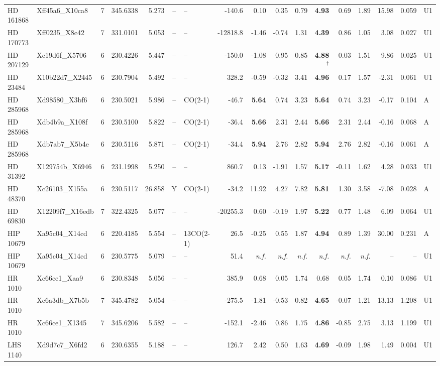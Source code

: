 \begin{tabular}{@{}l@{~}l@{~}c@{~}r@{~}r@{~}c@{~}l@{~}r@{~~}r@{~}r@{~}r@{~~}r@{~}r@{~}r@{~~}r@{~}r@{~}l@{}}
HD 161868 & Xff45a6\_X10ca8 & 7 & 345.6338 & 5.273 & -- & -- & -140.6 & 0.10 & 0.35 & 0.79 & \textbf{4.93} & 0.69 & 1.89 & 15.98 & 0.059 & U1 \\
HD 170773 & Xff0235\_X8c42 & 7 & 331.0101 & 5.053 & -- & -- & -12818.8 & -1.46 & -0.74 & 1.31 & \textbf{4.39} & 0.86 & 1.05 & 3.08 & 0.027 & U1 \\
HD 207129 & Xc19d6f\_X5706 & 6 & 230.4226 & 5.447 & -- & -- & -150.0 & -1.08 & 0.95 & 0.85 & \textbf{4.88}$^{\dagger}$ & 0.03 & 1.51 & 9.86 & 0.025 & U1 \\
HD 23484 & X10b22d7\_X2445 & 6 & 230.7904 & 5.492 & -- & -- & 328.2 & -0.59 & -0.32 & 3.41 & \textbf{4.96} & 0.17 & 1.57 & -2.31 & 0.061 & U1 \\
HD 285968 & Xd98580\_X3bf6 & 6 & 230.5021 & 5.986 & -- & CO(2-1) & -46.7 & \textbf{5.64} & 0.74 & 3.23 & \textbf{5.64} & 0.74 & 3.23 & -0.17 & 0.104 & A \\
HD 285968 & Xdb4b9a\_X108f & 6 & 230.5100 & 5.822 & -- & CO(2-1) & -36.4 & \textbf{5.66} & 2.31 & 2.44 & \textbf{5.66} & 2.31 & 2.44 & -0.16 & 0.068 & A \\
HD 285968 & Xdb7ab7\_X5b4e & 6 & 230.5116 & 5.871 & -- & CO(2-1) & -34.4 & \textbf{5.94} & 2.76 & 2.82 & \textbf{5.94} & 2.76 & 2.82 & -0.16 & 0.061 & A \\
HD 31392 & X129754b\_X6946 & 6 & 231.1998 & 5.250 & -- & -- & 860.7 & 0.13 & -1.91 & 1.57 & \textbf{5.17} & -0.11 & 1.62 & 4.28 & 0.033 & U1 \\
HD 48370 & Xc26103\_X155a & 6 & 230.5117 & 26.858 & Y & CO(2-1) & -34.2 & 11.92 & 4.27 & 7.82 & \textbf{5.81} & 1.30 & 3.58 & -7.08 & 0.028 & A \\
HD 69830 & X12209f7\_X16edb & 7 & 322.4325 & 5.077 & -- & -- & -20255.3 & 0.60 & -0.19 & 1.97 & \textbf{5.22} & 0.77 & 1.48 & 6.09 & 0.064 & U1 \\
HIP 10679 & Xa95c04\_X14cd & 6 & 220.4185 & 5.554 & -- & 13CO(2-1) & 26.5 & -0.25 & 0.55 & 1.87 & \textbf{4.94} & 0.89 & 1.39 & 30.00 & 0.231 & A \\
HIP 10679 & Xa95c04\_X14cd & 6 & 230.5775 & 5.079 & -- & -- & 51.4 & \emph{n.f.} & \emph{n.f.} & \emph{n.f.} & \emph{n.f.} & \emph{n.f.} & \emph{n.f.} & -- & -- & U1 \\
HR 1010 & Xc66ce1\_Xaa9 & 6 & 230.8348 & 5.056 & -- & -- & 385.9 & 0.68 & 0.05 & 1.74 & 0.68 & 0.05 & 1.74 & 0.10 & 0.086 & U1 \\
HR 1010 & Xc6a3db\_X7b5b & 7 & 345.4782 & 5.054 & -- & -- & -275.5 & -1.81 & -0.53 & 0.82 & \textbf{4.65} & -0.07 & 1.21 & 13.13 & 1.208 & U1 \\
HR 1010 & Xc66ce1\_X1345 & 7 & 345.6206 & 5.582 & -- & -- & -152.1 & -2.46 & 0.86 & 1.75 & \textbf{4.86} & -0.85 & 2.75 & 3.13 & 1.199 & U1 \\
LHS 1140 & Xd9d7c7\_X6fd2 & 6 & 230.6355 & 5.188 & -- & -- & 126.7 & 2.42 & 0.50 & 1.63 & \textbf{4.69} & -0.09 & 1.98 & 1.49 & 0.004 & U1 \\
\hline
\end{tabular}
